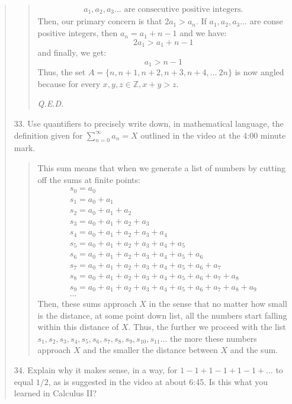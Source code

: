 \documentclass[12pt, a4paper]{article}                      %
\begin{document}
\begin{enumerate}
\begin{quote}
\begin{itemize}
\begin{quote}
\begin{align*}
a_1, a_2, a_3 ... \mbox{ are consecutive positive integers}.
\end{align*}
Then, our primary concern is that $2a_1 > a_n$. If $a_1, a_2, a_3...$ are conse
positive integers, then $a_n = a_1 + n - 1$ and we have:
$$2a_1 > a_1 + n - 1$$
and finally, we get:
$$a_1 > n - 1$$
Thus, the set $A = \{n, n + 1, n + 2, n + 3, n + 4, ... \ 2n\}$ is now angled because
for every $x,y,z \in \mathbb{Z}, x + y > z$.
\begin{flushright}
\textit{Q.E.D.}
\end{flushright}
\end{quote}
\end{itemize}
\item[33.]
Use quantifiers to precisely write down, in mathematical language, the definition given
for $\sum^{\infty}_{n=0}a_n = X$ outlined in the video at the 4:00 minute mark.
\begin{quote}
This sum means that when we generate a list of numbers by cutting off the sums at finite points:\\
\begin{align*}
s_0 = a_0\\
s_1 = a_0 + a_1\\
s_2 = a_0 + a_1 + a_2\\
s_3 = a_0 + a_1 + a_2 + a_3\\
s_4 = a_0 + a_1 + a_2 + a_3 + a_4\\
s_5 = a_0 + a_1 + a_2 + a_3 + a_4 + a_5\\
s_6 = a_0 + a_1 + a_2 + a_3 + a_4 + a_5 + a_6\\
s_7 = a_0 + a_1 + a_2 + a_3 + a_4 + a_5 + a_6 + a_7\\
s_8 = a_0 + a_1 + a_2 + a_3 + a_4 + a_5 + a_6 + a_7 + a_8\\
s_9 = a_0 + a_1 + a_2 + a_3 + a_4 + a_5 + a_6 + a_7 + a_8 + a_9\\
...
\end{align*}
Then, these sums approach $X$ in the sense that no matter how small is the distance,
at some point down list, all the numbers start falling within this distance of $X$.
Thus, the further we proceed with the list $s_1, s_2, s_3, s_4, s_5, s_6, s_7, s_8, s_9, s_10, s_11 ...$
the more these numbers approach $X$ and the smaller the distance between $X$ and the sum.
\end{quote}
\item[34.]
Explain why it makes sense, in a way, for $1 - 1 + 1 - 1 + 1 - 1 + ...$ to equal $1/2$,
as is suggested in the video at about 6:45. Is this what you learned in Calculus II?

\end{quote}
\end{enumerate}
\end{document}
